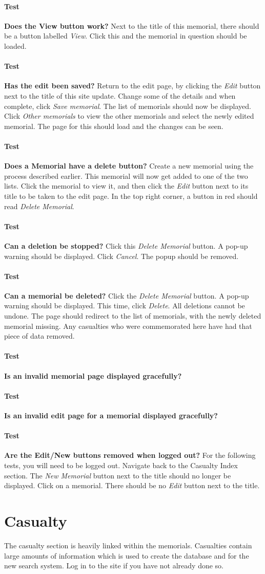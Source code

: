 \documentclass[12pt]{article}
\newcounter{Test}
\newcommand{\test}[1]{%
\stepcounter{Test}%
\paragraph{Test \theTest} \textbf{#1} }
\begin{document}
\test{Does the View button work?}
Next to the title of this memorial, there should be a button labelled \textit{View}. Click this and the memorial in question should be loaded.

\test{Has the edit been saved?}
Return to the edit page, by clicking the \textit{Edit} button next to the title of this site update. Change some of the details and when complete, click \textit{Save memorial}. The list of memorials should now be displayed. Click \textit{Other memorials} to view the other memorials and select the newly edited memorial. The page for this should load and the changes can be seen.

\test{Does a Memorial have a delete button?}
Create a new memorial using the process described earlier. This memorial will now get added to one of the two lists. Click the memorial to view it, and then click the \textit{Edit} button next to its title to be taken to the edit page. In the top right corner, a button in red should read \textit{Delete Memorial}.

\test{Can a deletion be stopped?}
Click this \textit{Delete Memorial} button. A pop-up warning should be displayed. Click \textit{Cancel}. The popup should be removed.

\test{Can a memorial be deleted?}
Click the \textit{Delete Memorial} button. A pop-up warning should be displayed. This time, click \textit{Delete}. All deletions cannot be undone. The page should redirect to the list of memorials, with the newly deleted memorial missing. Any casualties who were commemorated here have had that piece of data removed.

\test{Is an invalid memorial page displayed gracefully?}

\test{Is an invalid edit page for a memorial displayed gracefully?}

\test{Are the Edit/New buttons removed when logged out?}
For the following tests, you will need to be logged out. Navigate back to the Casualty Index section. The \textit{New Memorial} button next to the title should no longer be displayed. Click on a memorial. There should be no \textit{Edit} button next to the title.

\section{Casualty}\label{sec:casualty}
The casualty section is heavily linked within the memorials. Casualties contain large amounts of information which is used to create the database and for the new search system. Log in to the site if you have not already done so.
\end{document}

